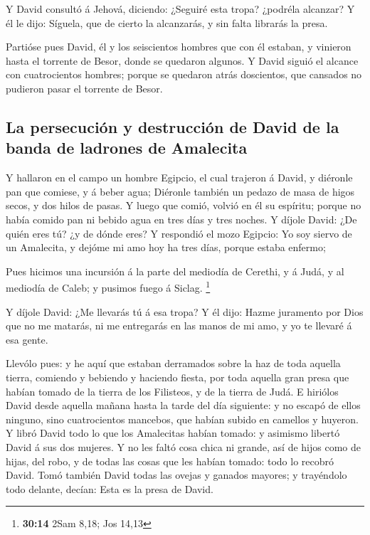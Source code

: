  Y David consultó á Jehová, diciendo: ¿Seguiré esta tropa?
¿podréla alcanzar? Y él le dijo: Síguela, que de cierto la alcanzarás, y
sin falta librarás la presa.

 Partióse pues David, él y los seiscientos hombres que con
él estaban, y vinieron hasta el torrente de Besor, donde se quedaron
algunos.  Y David siguió el alcance con cuatrocientos
hombres; porque se quedaron atrás doscientos, que cansados no pudieron
pasar el torrente de Besor.

\hypertarget{la-persecuciuxf3n-y-destrucciuxf3n-de-david-de-la-banda-de-ladrones-de-amalecita}{%
\subsection{La persecución y destrucción de David de la banda de
ladrones de
Amalecita}\label{la-persecuciuxf3n-y-destrucciuxf3n-de-david-de-la-banda-de-ladrones-de-amalecita}}

 Y hallaron en el campo un hombre Egipcio, el cual
trajeron á David, y diéronle pan que comiese, y á beber agua;
 Diéronle también un pedazo de masa de higos secos, y dos
hilos de pasas. Y luego que comió, volvió en él su espíritu; porque no
había comido pan ni bebido agua en tres días y tres noches.
 Y díjole David: ¿De quién eres tú? ¿y de dónde eres? Y
respondió el mozo Egipcio: Yo soy siervo de un Amalecita, y dejóme mi
amo hoy ha tres días, porque estaba enfermo;

 Pues hicimos una incursión á la parte del mediodía de
Cerethi, y á Judá, y al mediodía de Caleb; y pusimos fuego á Siclag.
\footnote{\textbf{30:14} 2Sam 8,18; Jos 14,13}

 Y díjole David: ¿Me llevarás tú á esa tropa? Y él dijo:
Hazme juramento por Dios que no me matarás, ni me entregarás en las
manos de mi amo, y yo te llevaré á esa gente.

 Llevólo pues: y he aquí que estaban derramados sobre la
haz de toda aquella tierra, comiendo y bebiendo y haciendo fiesta, por
toda aquella gran presa que habían tomado de la tierra de los Filisteos,
y de la tierra de Judá.  E hiriólos David desde aquella
mañana hasta la tarde del día siguiente: y no escapó de ellos ninguno,
sino cuatrocientos mancebos, que habían subido en camellos y huyeron.
 Y libró David todo lo que los Amalecitas habían tomado:
y asimismo libertó David á sus dos mujeres.  Y no les
faltó cosa chica ni grande, así de hijos como de hijas, del robo, y de
todas las cosas que les habían tomado: todo lo recobró David.
 Tomó también David todas las ovejas y ganados mayores; y
trayéndolo todo delante, decían: Esta es la presa de David.

